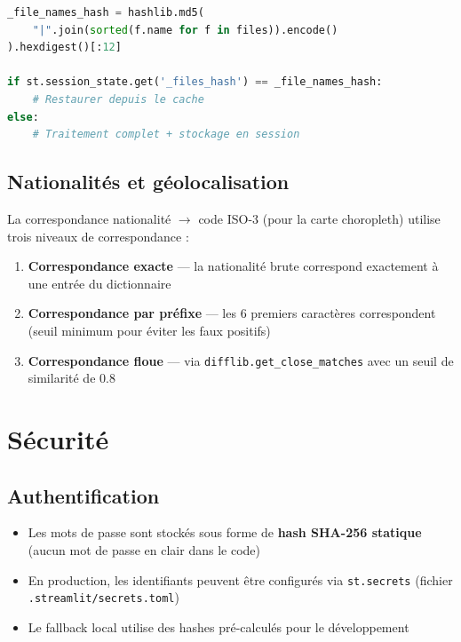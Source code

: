 \documentclass[12pt,a4paper,twoside]{article}
\begin{document}
\begin{lstlisting}[language=Python, caption={M\'{e}canisme de cache}]
_file_names_hash = hashlib.md5(
    "|".join(sorted(f.name for f in files)).encode()
).hexdigest()[:12]

if st.session_state.get('_files_hash') == _file_names_hash:
    # Restaurer depuis le cache
else:
    # Traitement complet + stockage en session
\end{lstlisting}

\subsection{Nationalit\'{e}s et g\'{e}olocalisation}

La correspondance nationalit\'{e} $\rightarrow$ code ISO-3 (pour la carte choropleth) utilise trois niveaux de correspondance :

\begin{enumerate}[leftmargin=2em]
  \item \textbf{Correspondance exacte} --- la nationalit\'{e} brute correspond exactement \`{a} une entr\'{e}e du dictionnaire
  \item \textbf{Correspondance par pr\'{e}fixe} --- les 6 premiers caract\`{e}res correspondent (seuil minimum pour \'{e}viter les faux positifs)
  \item \textbf{Correspondance floue} --- via \texttt{difflib.get\_close\_matches} avec un seuil de similarit\'{e} de 0.8
\end{enumerate}

\section{S\'{e}curit\'{e}}

\subsection{Authentification}

\begin{itemize}[leftmargin=2em]
  \item Les mots de passe sont stock\'{e}s sous forme de \textbf{hash SHA-256 statique} (aucun mot de passe en clair dans le code)
  \item En production, les identifiants peuvent \^{e}tre configur\'{e}s via \texttt{st.secrets} (fichier \texttt{.streamlit/secrets.toml})
  \item Le fallback local utilise des hashes pr\'{e}-calcul\'{e}s pour le d\'{e}veloppement
\end{itemize}
\end{document}
